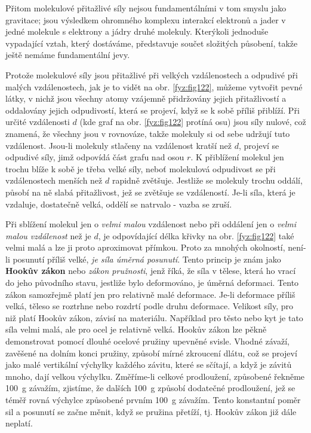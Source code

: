     Přitom molekulové přitažlivé síly nejsou fundamentálními v tom smyslu jako gravitace; jsou 
    výsledkem ohromného komplexu interakcí elektronů a jader v jedné molekule s elektrony a jádry 
    druhé molekuly. Kterýkoli jednoduše vypadající vztah, který dostáváme, představuje součet 
    složitých působení, takže ještě nemáme fundamentální jevy.
    
    Protože molekulové síly jsou přitažlivé při velkých vzdálenostech a odpudivé při malých 
    vzdálenostech, jak je to vidět na obr. \ref{fyz:fig122}, můžeme vytvořit pevné látky, v nichž 
    jsou všechny atomy vzájemně přidržovány jejich přitažlivostí a oddalovány jejich odpudivostí, 
    která se projeví, když se k sobě příliš přiblíží. Při určité vzdálenosti \(d\) (kde graf na 
    obr. \ref{fyz:fig122} protíná osu) jsou síly nulové, což znamená, že všechny jsou v rovnováze, 
    takže molekuly si od sebe udržují tuto vzdálenost. Jsou-li molekuly stlačeny na vzdálenost 
    kratší než \(d\), projeví se odpudivé síly, jimž odpovídá část grafu nad osou \(r\). K 
    přiblížení molekul jen trochu blíže k sobě je třeba velké síly, neboť molekulová odpudivost se 
    při vzdálenostech menších než \(d\) rapidně zvětšuje. Jestliže se molekuly trochu oddálí, 
    působí na ně slabá přitažlivost, jež se zvětšuje se vzdáleností. Je-li síla, která je vzdaluje, 
    dostatečně velká, oddělí se natrvalo - vazba se zruší.
    
    Při sblížení molekul jen o \emph{velmi malou} vzdálenost nebo při oddálení jen o \emph{velmi 
    malou vzdálenost} než je \(d\), je odpovídající délka křivky na obr. \ref{fyz:fig122} také 
    velmi malá a lze ji proto aproximovat přímkou. Proto za mnohých okolností, není-li posunutí 
    příliš velké, \emph{je síla úměrná posunutí}. Tento princip je znám jako \textbf{Hookův zákon} 
    nebo \emph{zákon pružnosti}, jenž říká, že síla v tělese, která ho vrací do jeho původního 
    stavu, jestliže bylo deformováno, je úměrná deformaci. Tento zákon samozřejmě platí jen pro 
    relativně malé deformace. Je-li deformace příliš velká, těleso se roztrhne nebo rozdrtí podle 
    druhu deformace. Velikost síly, pro niž platí Hookův zákon, závisí na materiálu. Například pro 
    těsto nebo kyt je tato síla velmi malá, ale pro ocel je relativně velká. Hookův zákon lze pěkně 
    demonstrovat pomocí dlouhé ocelové pružiny upevněné svisle. Vhodné závaží, zavěšené na dolním 
    konci pružiny, způsobí mírné zkroucení dlátu, což se projeví jako malé vertikální výchylky 
    každého závitu, které se sčítají, a když je závitů mnoho, dají velkou výchylku. Změříme-li 
    celkové prodloužení, způsobené řekněme \SI{100}{\g} závažím, zjistíme, že dalších \SI{100}{\g} 
    způsobí dodatečné prodloužení, jež se téměř rovná výchylce způsobené prvním \SI{100}{\g} 
    závažím. Tento konstantní poměr sil a posunutí se začne měnit, když se pružina přetíží, tj. 
    Hookův zákon již dále neplatí.
    
